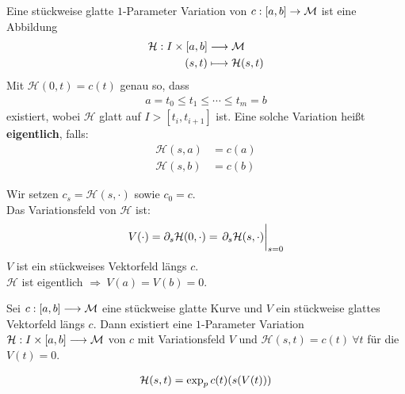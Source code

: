 \begin{defs}
Eine stückweise glatte $1$-Parameter Variation von $c:[a, b] \rightarrow \mathcal{M}$ ist eine Abbildung
\begin{align*}
\mathcal{H}: I \times [a, b] &\longrightarrow \mathcal{M} \\
(s, t) &\longmapsto \mathcal{H}(s, t)
\end{align*}
Mit $\mathcal{H}(0, t) = c(t)$ genau so, dass 
\begin{align*}
a= t_0 \leq t_1 \leq \cdots \leq t_m = b
\end{align*}
existiert, wobei $\mathcal{H}$ glatt auf $I > [t_i, t_{i+1}]$ ist.
Eine solche Variation heißt \textbf{eigentlich}, falls:
\begin{align*}
\mathcal{H}(s, a) &= c(a) \\
\mathcal{H}(s, b) &= c(b) 
\end{align*}
\end{defs}
Wir setzen $c_s = \mathcal{H}(s, \cdot)$ sowie $c_0 = c$. \\
Das Variationsfeld von $\mathcal{H}$ ist:
\begin{align*}
V(\cdot) = \partial_s \mathcal{H}(0,\cdot) = \eval{\partial_s \mathcal{H}(s, \cdot)}_{s=0}
\end{align*}
$V$ ist ein stückweises Vektorfeld längs $c$. \\
$\mathcal{H}$ ist eigentlich $\Rightarrow \ V(a) = V(b) = 0$.
\begin{lem}
Sei $c:[a, b] \longrightarrow \mathcal{M}$ eine stückweise glatte Kurve und $V$ ein stückweise glattes Vektorfeld längs $c$. 
Dann existiert eine $1$-Parameter Variation $\mathcal{H}: I \times [a, b] \longrightarrow \mathcal{M}$ von $c$ mit Variationsfeld $V$ und $\mathcal{H}(s, t) = c(t) \ \forall t$ für die $V(t)=0$.
\end{lem}
\begin{bew}
\begin{align*}
\mathcal{H}(s, t) = \operatorname{exp}_p{c(t)}(s(V(t)))
\end{align*}
\end{bew}

